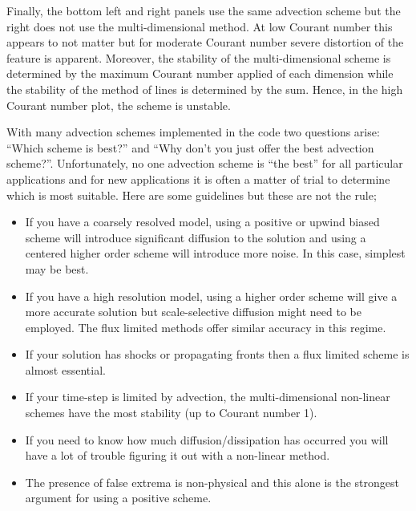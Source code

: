 Finally, the bottom left and right panels use the same advection
scheme but the right does not use the multi-dimensional method. At low
Courant number this appears to not matter but for moderate Courant
number severe distortion of the feature is apparent. Moreover, the
stability of the multi-dimensional scheme is determined by the maximum
Courant number applied of each dimension while the stability of the
method of lines is determined by the sum. Hence, in the high Courant
number plot, the scheme is unstable.

With many advection schemes implemented in the code two questions
arise: ``Which scheme is best?'' and ``Why don't you just offer the
best advection scheme?''. Unfortunately, no one advection scheme is
``the best'' for all particular applications and for new applications
it is often a matter of trial to determine which is most
suitable. Here are some guidelines but these are not the rule;
\begin{itemize}
\item If you have a coarsely resolved model, using a
positive or upwind biased scheme will introduce significant diffusion
to the solution and using a centered higher order scheme will
introduce more noise. In this case, simplest may be best.
\item If you have a high resolution model, using a higher order
scheme will give a more accurate solution but scale-selective
diffusion might need to be employed. The flux limited methods
offer similar accuracy in this regime.
\item If your solution has shocks or propagating fronts then a
flux limited scheme is almost essential.
\item If your time-step is limited by advection, the multi-dimensional
non-linear schemes have the most stability (up to Courant number 1).
\item If you need to know how much diffusion/dissipation has occurred you
will have a lot of trouble figuring it out with a non-linear method.
\item The presence of false extrema is non-physical and this alone is the
strongest argument for using a positive scheme.
\end{itemize}
